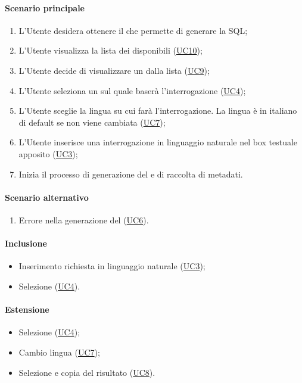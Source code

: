 \paragraph*{Scenario principale}
\begin{enumerate}
  \item L’Utente desidera ottenere il  che permette di generare la  SQL;
  \item L'Utente visualizza la lista dei  disponibili (\hyperref[UC10]{UC10});
  \item L'Utente decide di visualizzare un  dalla lista (\hyperref[UC9]{UC9});
  \item L’Utente seleziona un  sul quale baserà l’interrogazione (\hyperref[UC4]{UC4});
  \item L’Utente sceglie la lingua su cui farà l’interrogazione. La lingua è in italiano di default se non viene cambiata (\hyperref[UC7]{UC7});
  \item L’Utente inserisce una interrogazione in linguaggio naturale nel box testuale apposito (\hyperref[UC3]{UC3});
  \item Inizia il processo di generazione del  e di raccolta di metadati.
\end{enumerate}

\paragraph*{Scenario alternativo}
\begin{enumerate}
  \item Errore nella generazione del  (\hyperref[UC6]{UC6}).
\end{enumerate}

\paragraph*{Inclusione}
\begin{itemize}
  \item Inserimento richiesta in linguaggio naturale (\hyperref[UC3]{UC3});
  \item Selezione  (\hyperref[UC4]{UC4}).
\end{itemize}

\paragraph*{Estensione}
\begin{itemize}
  \item Selezione  (\hyperref[UC4]{UC4});
  \item Cambio lingua (\hyperref[UC7]{UC7});
  \item Selezione e copia del  risultato (\hyperref[UC8]{UC8}).
\end{itemize}
